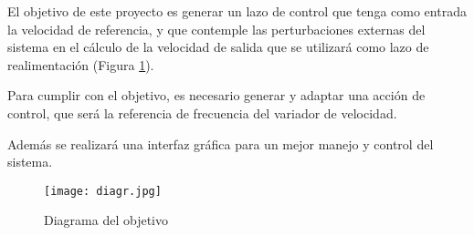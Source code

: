 El objetivo de este proyecto es generar un lazo de control que tenga como entrada la velocidad de referencia, y que contemple las perturbaciones externas del sistema en el cálculo de la velocidad de salida que se utilizará como lazo de realimentación (Figura \ref{fig:diagr}). 

Para cumplir con el objetivo, es necesario generar y adaptar una acción de control, que será la referencia de frecuencia del variador de velocidad.

Además se realizará una interfaz gráfica para un mejor manejo y control del sistema.

\begin{figure}[htb]
	\centering
	\texttt{[image: diagr.jpg]}
	\caption{Diagrama del objetivo}
	\label{fig:diagr}
	\end{figure}


	\newpage